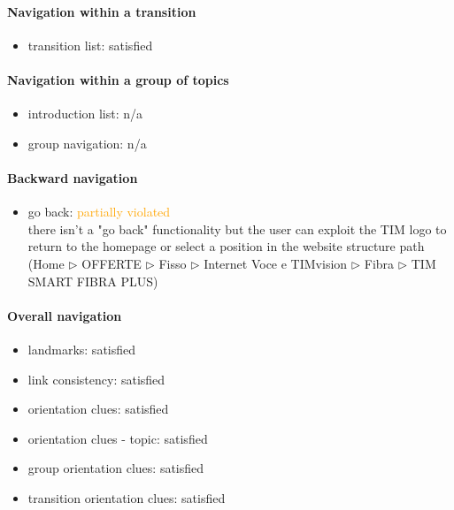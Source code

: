 \begin{enumerate}
	\paragraph*{Navigation within a transition}
	\begin{itemize}
		\item transition list: satisfied
	\end{itemize}

	\paragraph*{Navigation within a group of topics}
	\begin{itemize}
		\item introduction list: n/a
		\item group navigation: n/a
	\end{itemize}

	\paragraph*{Backward navigation}
	\begin{itemize}
		\item go back: \textcolor {orange}{partially violated}\\
		there isn't a "go back" functionality but the user can exploit the TIM logo to return to the homepage or select a position in the website structure path (Home $\triangleright$ OFFERTE $\triangleright$ Fisso $\triangleright$ Internet Voce e TIMvision $\triangleright$ Fibra $\triangleright$ TIM SMART FIBRA PLUS)
	\end{itemize}

	\paragraph*{Overall navigation}
	\begin{itemize}
		\item landmarks: satisfied
		\item link consistency: satisfied
		\item orientation clues: satisfied
		\item orientation clues - topic: satisfied
		\item group orientation clues: satisfied
		\item transition orientation clues: satisfied
	\end{itemize}	


\end{enumerate}
